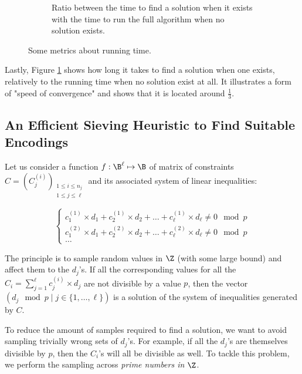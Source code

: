 \begin{figure}
\begin{subfigure}{0.35\textwidth}
        \caption{Ratio between the time to find a solution when it exists with the time to run the full algorithm when no solution exists.}
        \label{fig:barplot_ratio}
    \end{subfigure}
    \caption{Some metrics about running time.}
    \label{fig:overall}
\end{figure}
Lastly, Figure \ref{fig:barplot_ratio} shows how long it takes to find a solution when one exists, relatively to the running time when no solution exist at all. It illustrates a form of "speed of convergence" and shows that it is located around $\frac{1}{3}$.



    
\subsection{An Efficient Sieving Heuristic to Find Suitable Encodings}
\label{sec:heuristic_matthieu}


Let us consider a function $f: \B^\ell \mapsto \B$ of matrix of constraints $C=(C_j^{(i)})_{\substack{1 \le i \le n_j\\1 \le j \le \ell}}$ and its associated system of linear inequalities:

$$
\left \{
\begin{array}{c}
     c_1^{(1)} \times d_1 + c_2^{(1)} \times d_2 + \dots + c_\ell^{(1)} \times d_\ell   \neq 0 \mod p\\
     c_1^{(2)} \times d_1 + c_2^{(2)} \times d_2 + \dots + c_\ell^{(2)} \times d_\ell \neq 0 \mod p\\
    \dots
\end{array}
\right .
$$


The principle is to sample random values in $\Z$ (with some large bound) and affect them to the $d_j$'s. If all the corresponding values for all the $C_i = \sum_{j=1}^{\ell} c_j^{(i)} \times d_j$ are not divisible by a value $p$, then the vector $(d_j \mod p \mid j \in \{1, \dots, \ell\})$ is a solution of the system of inequalities generated by $C$. 


To reduce the amount of samples required to find a solution, we want to avoid sampling trivially wrong sets of $d_j$'s. For example, if all the $d_j$'s are themselves divisible by $p$, then the $C_i$'s will all be divisible as well. To tackle this problem, we perform the sampling across \emph{prime numbers in $\Z$}.



